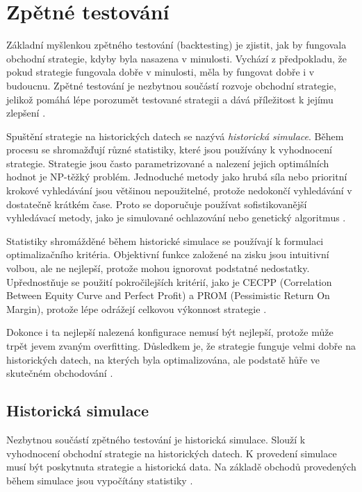 \chapter{Zpětné testování}
Základní myšlenkou zpětného testování (backtesting) je zjistit, jak by fungovala obchodní strategie, kdyby byla nasazena v minulosti.
Vychází z předpokladu, že pokud strategie fungovala dobře v minulosti, měla by fungovat dobře i v budoucnu.
Zpětné testování je nezbytnou součástí rozvoje obchodní strategie, jelikož pomáhá lépe porozumět testované strategii a dává příležitost k jejímu zlepšení \cite{efficient-backtesting}.

Spuštění strategie na historických datech se nazývá \textit{historická simulace}.
Během procesu se shromažďují různé statistiky, které jsou používány k vyhodnocení strategie.
Strategie jsou často parametrizované a nalezení jejich optimálních hodnot je NP-těžký problém.
Jednoduché metody jako hrubá síla nebo prioritní krokové vyhledávání jsou většinou nepoužitelné, protože nedokončí vyhledávání v dostatečně krátkém čase.
Proto se doporučuje používat sofistikovanější vyhledávací metody, jako je simulované ochlazování nebo genetický algoritmus
\cite{pardo, efficient-backtesting}.

Statistiky shromážděné během historické simulace se používají k formulaci optimalizačního kritéria.
Objektivní funkce založené na zisku jsou intuitivní volbou, ale ne nejlepší, protože mohou ignorovat podstatné nedostatky.
Upřednostňuje se použití pokročilejších kritérií, jako je CECPP (Correlation Between Equity Curve and Perfect Profit) a PROM (Pessimistic Return On Margin), protože lépe odrážejí celkovou výkonnost strategie \cite{pardo}.

Dokonce i ta nejlepší nalezená konfigurace nemusí být nejlepší, protože může trpět jevem zvaným overfitting.
Důsledkem je, že strategie funguje velmi dobře na historických datech, na kterých byla optimalizována, ale podstatě hůře ve skutečném obchodování \cite{pardo}.

\section{Historická simulace}
Nezbytnou součástí zpětného testování je historická simulace.
Slouží k vyhodnocení obchodní strategie na historických datech.
K provedení simulace musí být poskytnuta strategie a historická data.
Na základě obchodů provedených během simulace jsou vypočítány statistiky \cite{pardo}.

